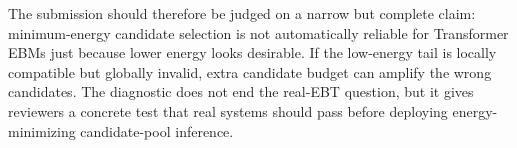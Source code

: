 \documentclass{article}
\begin{document}
The submission should therefore be judged on a narrow but complete claim:
minimum-energy candidate selection is not automatically reliable for
Transformer EBMs just because lower energy looks desirable. If the low-energy
tail is locally compatible but globally invalid, extra candidate budget can
amplify the wrong candidates. The diagnostic does not end the real-EBT
question, but it gives reviewers a concrete test that real systems should
pass before deploying energy-minimizing candidate-pool inference.



\end{document}
